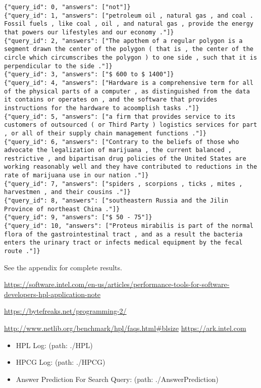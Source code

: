 \documentclass{mcmthesis}
\begin{document}
\begin{lstlisting}
{"query_id": 0, "answers": ["not"]}
{"query_id": 1, "answers": ["petroleum oil , natural gas , and coal . Fossil fuels , like coal , oil , and natural gas , provide the energy that powers our lifestyles and our economy ."]}
{"query_id": 2, "answers": ["The apothem of a regular polygon is a segment drawn the center of the polygon ( that is , the center of the circle which circumscribes the polygon ) to one side , such that it is perpendicular to the side ."]}
{"query_id": 3, "answers": ["$ 600 to $ 1400"]}
{"query_id": 4, "answers": ["Hardware is a comprehensive term for all of the physical parts of a computer , as distinguished from the data it contains or operates on , and the software that provides instructions for the hardware to acoomplish tasks ."]}
{"query_id": 5, "answers": ["a firm that provides service to its customers of outsourced ( or Third Party ) logistics services for part , or all of their supply chain management functions ."]}
{"query_id": 6, "answers": ["Contrary to the beliefs of those who advocate the legalization of marijuana , the current balanced , restrictive , and bipartisan drug policies of the United States are working reasonably well and they have contributed to reductions in the rate of marijuana use in our nation ."]}
{"query_id": 7, "answers": ["spiders , scorpions , ticks , mites , harvestmen , and their cousins ."]}
{"query_id": 8, "answers": ["southeastern Russia and the Jilin Province of northeast China ."]}
{"query_id": 9, "answers": ["$ 50 - 75"]}
{"query_id": 10, "answers": ["Proteus mirabilis is part of the normal flora of the gastrointestinal tract , and as a result the bacteria enters the urinary tract or infects medical equipment by the fecal route ."]}
\end{lstlisting}

See the appendix for complete results.


\begin{thebibliography}{99}

 \url{https://software.intel.com/en-us/articles/performance-tools-for-software-developers-hpl-application-note}

 \url{https://bytefreaks.net/programming-2/}

 \url{http://www.netlib.org/benchmark/hpl/faqs.html#blsize}
 \url{https://ark.intel.com}
\end{thebibliography}



\begin{appendices}
\begin{itemize}
	\item HPL Log: \quad (path: ./HPL)
	\item HPCG Log: \quad  (path: ./HPCG)
	\item Answer Prediction For Search Query: \quad  (path: ./AnswerPrediction)
\end{itemize}
\end{appendices}
\end{document}
